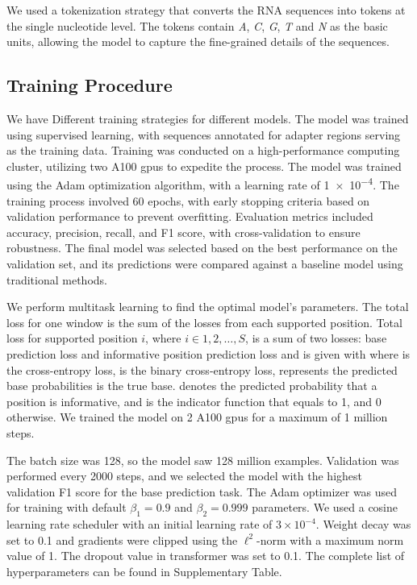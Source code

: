\documentclass[pdflatex, sn-mathphys-num, lineno]{sn-jnl}%
\theoremstyle{thmstyleone}%
\theoremstyle{thmstyletwo}%
\theoremstyle{thmstylethree}%
\begin{document}
We used a tokenization strategy that converts the RNA sequences into tokens at the single nucleotide level.
The tokens contain \emph{A}, \emph{C}, \emph{G}, \emph{T} and \emph{N} as the basic units, allowing the model to capture the fine-grained details of the sequences.

\subsection{Training Procedure}\label{ssec:training}

We have Different training strategies for different models.
The model was trained using supervised learning, with sequences annotated for adapter regions serving as the training data.
Training was conducted on a high-performance computing cluster, utilizing two A100 \glspl{gpu} to expedite the process.
The model was trained using the Adam optimization algorithm, with a learning rate of \num{1e-4}.
The training process involved \num{60} epochs, with early stopping criteria based on validation performance to prevent overfitting.
Evaluation metrics included accuracy, precision, recall, and F1 score, with cross-validation to ensure robustness.
The final model was selected based on the best performance on the validation set, and its predictions were compared against a baseline model using traditional methods.

We perform multitask learning to find the optimal model's parameters.
The total loss for one window is the sum of the losses from each supported position.
Total loss for supported position  \( i \), where \( i  \in {1,2, \ldots, S} \), is a sum of two losses: base prediction loss and informative position prediction loss and is given with
where is the cross-entropy loss,  is the binary cross-entropy loss, represents the predicted base probabilities is the true base.
denotes the predicted probability that a
position is informative, and is the indicator function that equals to 1, and 0 otherwise.
We trained the model on 2 A100 \glspl{gpu} for a maximum of 1 million steps.

The batch size was \num{128}, so the model saw \num{128} million examples.
Validation was performed every 2000 steps, and we selected the model with the highest validation F1 score for the base prediction task.
The Adam optimizer was used for training with default \( \beta_{1} = 0.9 \) and \( \beta_{2} = 0.999 \) parameters.
We used a cosine learning rate scheduler with an initial learning rate of \( 3 \times 10^{-4} \).
Weight decay was set to 0.1 and gradients were clipped using the \( \ell^{2}\)-norm with a maximum norm value of 1.
The dropout value in transformer was set to \num{0.1}.
The complete list of hyperparameters can be found in Supplementary Table.
\end{document}
